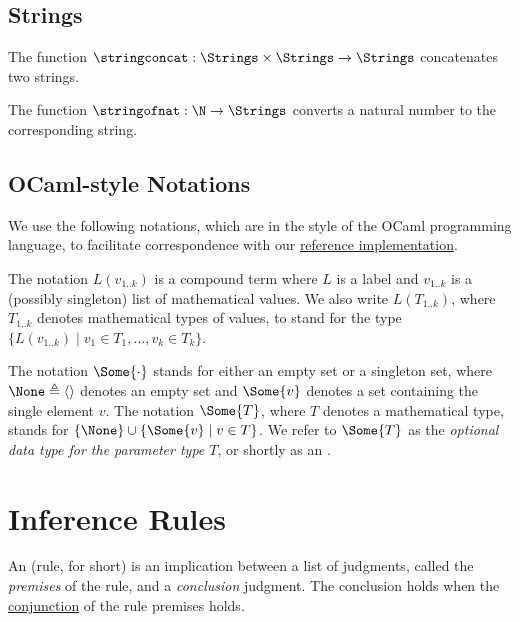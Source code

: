 \subsection{Strings}
\hypertarget{def-stringconcat}{}
The function $\stringconcat : \Strings \times \Strings \rightarrow \Strings$
concatenates two strings.

\hypertarget{def-stringofnat}{}
The function $\stringofnat : \N \rightarrow \Strings$ converts a natural number
to the corresponding string.

\subsection{OCaml-style Notations}
We use the following notations, which are in the style of the OCaml programming language,
to facilitate correspondence with our
\href{https://github.com/herd/herdtools7/tree/master/asllib}{reference implementation}.

The notation $L(v_{1..k})$ is a compound term where $L$ is a label and $v_{1..k}$ is a (possibly singleton) list of mathematical values.
We also write $L(T_{1..k})$, where $T_{1..k}$ denotes mathematical types of values, to stand for the type
$\{ L(v_{1..k}) \;|\; v_1\in T_1,\ldots,v_k\in T_k \}$.

\hypertarget{def-optional}{}
\begin{definition}
\hypertarget{def-none}{}
\hypertarget{def-some}{}
The notation $\Some{\cdot}$ stands for either an empty set or a singleton set,
where $\None\triangleq\langle\rangle$ denotes an empty set
and $\Some{v}$ denotes a set containing the single element $v$.
%
The notation $\Some{T}$, where $T$ denotes a mathematical type, stands for
$\{ \None \} \cup \{\Some{v} \;|\; v \in T\}$.
%
We refer to $\Some{T}$ as the \emph{optional data type for the parameter
type $T$}, or shortly as an \emph{\optional}.
\end{definition}

\section{Inference Rules\label{sec:Inference Rules}}
\hypertarget{def-inferencerule}{}
An \emph{\inferencerule} (rule, for short) is an implication between a list of judgments,
called the \emph{premises} of the rule,
and a \emph{conclusion} judgment.
The conclusion holds when the \underline{conjunction} of the rule premises holds.

